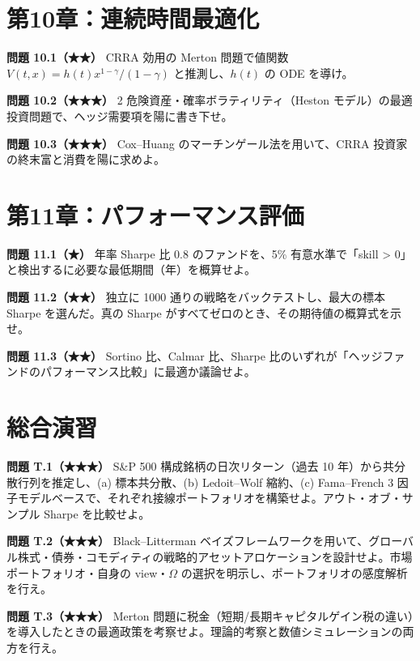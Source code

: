 \documentclass[11pt,a4paper]{report}
\begin{document}
\section{第10章：連続時間最適化}

\textbf{問題 10.1（★★）} CRRA 効用の Merton 問題で値関数 $V(t, x) = h(t) x^{1-\gamma}/(1-\gamma)$ と推測し、$h(t)$ の ODE を導け。

\textbf{問題 10.2（★★★）} 2 危険資産・確率ボラティリティ（Heston モデル）の最適投資問題で、ヘッジ需要項を陽に書き下せ。

\textbf{問題 10.3（★★★）} Cox–Huang のマーチンゲール法を用いて、CRRA 投資家の終末富と消費を陽に求めよ。

\section{第11章：パフォーマンス評価}

\textbf{問題 11.1（★）} 年率 Sharpe 比 0.8 のファンドを、5\% 有意水準で「skill > 0」と検出するに必要な最低期間（年）を概算せよ。

\textbf{問題 11.2（★★）} 独立に 1000 通りの戦略をバックテストし、最大の標本 Sharpe を選んだ。真の Sharpe がすべてゼロのとき、その期待値の概算式を示せ。

\textbf{問題 11.3（★★）} Sortino 比、Calmar 比、Sharpe 比のいずれが「ヘッジファンドのパフォーマンス比較」に最適か議論せよ。

\section{総合演習}

\textbf{問題 T.1（★★★）} S\&P 500 構成銘柄の日次リターン（過去 10 年）から共分散行列を推定し、(a) 標本共分散、(b) Ledoit–Wolf 縮約、(c) Fama–French 3 因子モデルベースで、それぞれ接線ポートフォリオを構築せよ。アウト・オブ・サンプル Sharpe を比較せよ。

\textbf{問題 T.2（★★★）} Black–Litterman ベイズフレームワークを用いて、グローバル株式・債券・コモディティの戦略的アセットアロケーションを設計せよ。市場ポートフォリオ・自身の view・$\Omega$ の選択を明示し、ポートフォリオの感度解析を行え。

\textbf{問題 T.3（★★★）} Merton 問題に税金（短期/長期キャピタルゲイン税の違い）を導入したときの最適政策を考察せよ。理論的考察と数値シミュレーションの両方を行え。

\noindent\hrulefill
\end{document}
